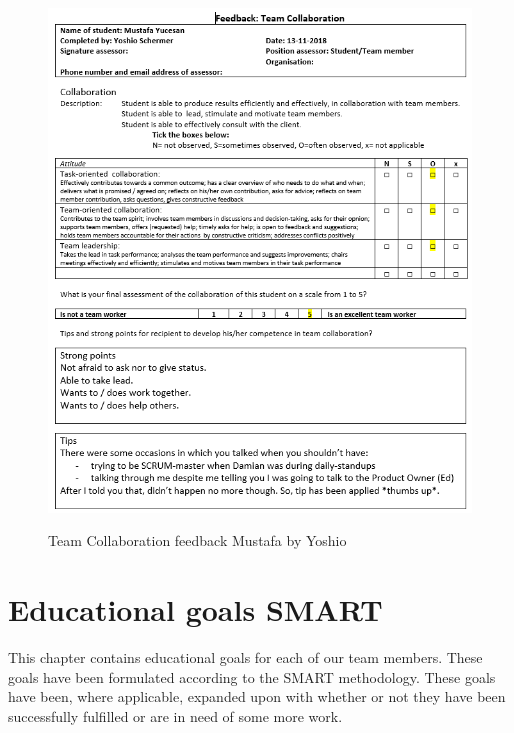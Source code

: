 \documentclass[12pt]{article}
\begin{document}
	\begin{figure}[p!]
		\centering
		\includegraphics[width=\columnwidth]{CoopMustafa3.PNG}\\
		\caption{Team Collaboration feedback Mustafa by Yoshio}
	\end{figure}
	\newpage
	\section{Educational goals SMART}
	This chapter contains educational goals for each of our team members. These goals have been formulated according to the SMART methodology.
	These goals have been, where applicable, expanded upon with whether or not they have been successfully fulfilled or are in need of some more work.
\end{document}
